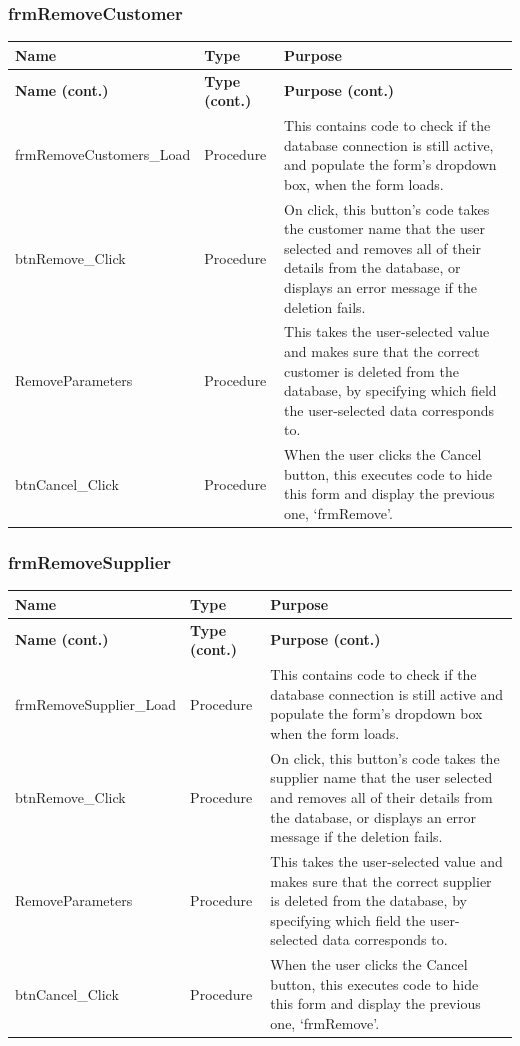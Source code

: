 	\subsubsection{frmRemoveCustomer}
	\begin{longtable}{ | p{4cm} | p{3cm} | p{10cm} | }
		\hline
		\textbf{Name} & \textbf{Type} & \textbf{Purpose}\\
		\endfirsthead
		\hline
		\textbf{Name (cont.)} & \textbf{Type (cont.)} & \textbf{Purpose (cont.)}\\
		\endhead
		\hline
		frmRemoveCustomers\_Load & Procedure & This contains code to check if the database connection is still active, and populate the form's dropdown box, when the form loads.\\
		\hline
		btnRemove\_Click & Procedure & On click, this button's code takes the customer name that the user selected and removes all of their details from the database, or displays an error message if the deletion fails.\\
		\hline
		RemoveParameters & Procedure & This takes the user-selected value and makes sure that the correct customer is deleted from the database, by specifying which field the user-selected data corresponds to.\\
		\hline
		btnCancel\_Click & Procedure & When the user clicks the Cancel button, this executes code to hide this form and display the previous one, `frmRemove'.\\
		\hline
	\end{longtable}
	\subsubsection{frmRemoveSupplier}
		\begin{longtable}{ | p{4cm} | p{3cm} | p{10cm} | }
		\hline
		\textbf{Name} & \textbf{Type} & \textbf{Purpose}\\
		\endfirsthead
		\hline
		\textbf{Name (cont.)} & \textbf{Type (cont.)} & \textbf{Purpose (cont.)}\\
		\endhead
		\hline
		frmRemoveSupplier\_Load & Procedure & This contains code to check if the database connection is still active and populate the form's dropdown box when the form loads.\\
		\hline
		btnRemove\_Click & Procedure & On click, this button's code takes the supplier name that the user selected and removes all of their details from the database, or displays an error message if the deletion fails.\\
		\hline
		RemoveParameters & Procedure & This takes the user-selected value and makes sure that the correct supplier is deleted from the database, by specifying which field the user-selected data corresponds to.\\
		\hline
		btnCancel\_Click & Procedure & When the user clicks the Cancel button, this executes code to hide this form and display the previous one, `frmRemove'.\\
		\hline
	\end{longtable}
	
